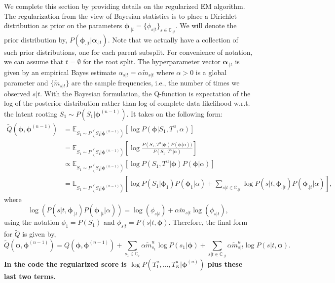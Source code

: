 \documentclass{article}
\newcommand{\E}{\mathbb{E}}
\begin{document}
We complete this section by providing details on the regularized EM algorithm.
The regularization from the view of Bayesian statistics is to place a Dirichlet distribution as prior on the parameters $\bm{\phi}_{.|t} = \{\phi_{s|t}\}_{s \in \mathbb{C}_{.|t}}$.
We will denote the prior distribution by, $P(\bm{\phi}_{.|t} | \bm{\alpha}_{.|t})$.
Note that we actually have a collection of such prior distributions, one for each parent subsplit.
For convenience of notation, we can assume that $t = \emptyset$ for the root split.
The hyperparameter vector $\bm{\alpha}_{.|t}$ is given by an empirical Bayes estimate $\alpha_{s|t} = \alpha \tilde{m}_{s|t}$ where $\alpha > 0$ is a global parameter and $\{\tilde{m}_{s|t}\}$ are the sample frequencies, i.e., the number of times we observed $s|t$.
With the Bayesian formulation, the Q-function is expectation of the log of the posterior distribution rather than log of complete data likelihood w.r.t. the latent rooting $S_1 \sim P(S_1 | \bm{\phi}^{(n-1)})$.
It takes on the following form:
\begin{align*}
    \tilde{Q}(\bm{\phi}, \bm{\phi}^{(n-1)}) &= \E_{S_1 \sim P(S_1 | \bm{\phi}^{(n-1)})}\left[ \log P(\bm{\phi} | S_1, T^u, \alpha) \right] \\
    &= \E_{S_1 \sim P(S_1 | \bm{\phi}^{(n-1)})}\left[ \log \frac{P(S_1, T^u | \bm{\phi}) P(\bm{\phi} | \alpha))}{P(S_1, T^u | \alpha)} \right] \\
    &\propto \E_{S_1 \sim P(S_1 | \bm{\phi}^{(n-1)})}\left[ \log P(S_1, T^u | \bm{\phi}) P(\bm{\phi} | \alpha) \right] \\
    &= \E_{S_1 \sim P(S_1 | \bm{\phi}^{(n-1)})}\left[ \log P(S_1 | \bm{\phi}_{1}) P(\bm{\phi}_1 | \alpha) + \sum\limits_{s|t \in \mathbb{C}_{.|t}} \log P(s | t, \bm{\phi}_{.|t}) P(\bm{\phi}_{.|t} | \alpha) \right],
\end{align*}
where
\begin{equation*}
    \log \left( P(s | t, \bm{\phi}_{.|t})P(\bm{\phi}_{.|t} | \alpha) \right) = \log(\phi_{s|t}) + \alpha \tilde{m}_{s|t} \log(\phi_{s|t}),
\end{equation*}
using the notation $\phi_1 = P(S_1)$ and $\phi_{s|t} = P(s | t, \bm{\phi})$. Therefore, the final form for $\tilde{Q}$ is given by,
\begin{equation*}
    \tilde{Q}(\bm{\phi}, \bm{\phi}^{(n-1)}) = Q(\bm{\phi}, \bm{\phi}^{(n-1)}) + \sum\limits_{s_1 \in \mathbb{C}_r} \alpha \tilde{m}_{s_1}^u \log P(s_1 | \bm{\phi}) + \sum\limits_{s|t \in \mathbb{C}_{.|t}} \alpha \tilde{m}_{s|t}^u \log P(s | t, \bm{\phi}).
\end{equation*}
\textbf{In the code the regularized score is $\log P(T^u_1, ..., T^u_K | \bm{\phi}^{(n)})$ plus these last two terms.}
\end{document}
